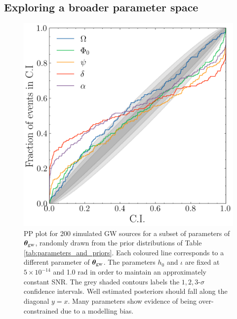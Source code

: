 \documentclass[fleqn,usenatbib,useAMS]{mnras}
\begin{document}
\subsection{Exploring a broader parameter space} \label{sec:parameter_space}
\begin{figure}
	\centering
	\includegraphics[width=\columnwidth]{images/pp_plot_new}
	\caption{PP plot for 200 simulated GW sources for a subset of parameters of $\boldsymbol{\theta}_{\rm gw}$, randomly drawn from the prior distributions of Table \ref{tab:parameters_and_priors}. Each coloured line corresponds to a different parameter of $\boldsymbol{\theta}_{\rm gw}$. The parameters $h_0$ and $\iota$ are fixed at $5 \times 10^{-14}$ and 1.0 rad in order to maintain an approximately constant SNR. The grey shaded contours labels the $1,2,3$-$\sigma$ confidence intervals. Well estimated posteriors should fall along the diagonal $y=x$. Many parameters show evidence of being over-constrained due to a modelling bias. }
	\label{fig:parameter_space}
\end{figure}
\end{document}
